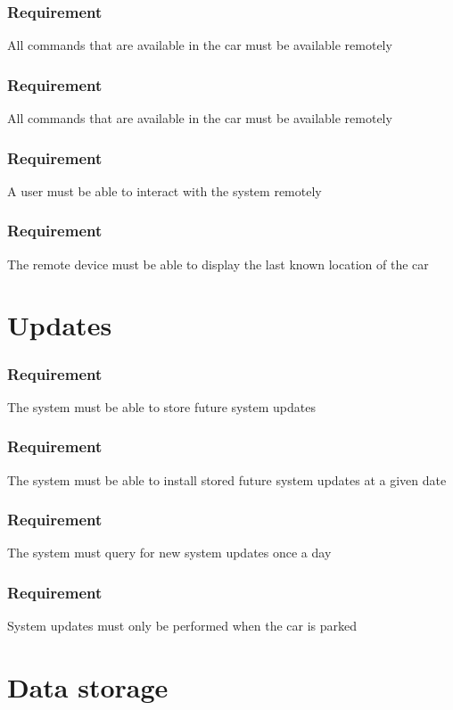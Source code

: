 \documentclass{article}
\begin{document}
{    \subsubsection{Requirement}
\hfill \break 
\- \- \-All commands that are available in the car must be available remotely
    \subsubsection{Requirement}
\hfill \break 
\- \- \-All commands that are available in the car must be available remotely
    \subsubsection{Requirement}
\hfill \break 
\- \- \-A user must be able to interact with the system remotely
    \subsubsection{Requirement}
\hfill \break 
\- \- \-The remote device must be able to display the last known location of the car

\section{Updates}
\setcounter{subsubsection}{0}
    \subsubsection{Requirement}
\hfill \break 
\- \- \-The system must be able to store future system updates
    \subsubsection{Requirement}
\hfill \break 
\- \- \-The system must be able to install stored future system updates at a given date
    \subsubsection{Requirement}
\hfill \break 
\- \- \-The system must query for new system updates once a day
    \subsubsection{Requirement}
\hfill \break 
\- \- \-System updates must only be performed when the car is parked

\section{Data storage}
\setcounter{subsubsection}{0}
}
\end{document}
